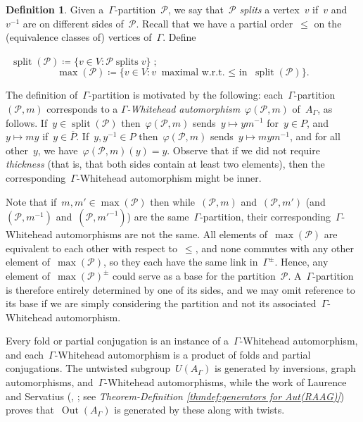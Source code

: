 \documentclass[11pt]{amsart}
\theoremstyle{definition}
\theoremstyle{definition}
\theoremstyle{definition}
\theoremstyle{definition}
\newtheorem{definition}[theorem]{Definition}
\newcommand{\calP}{\mathcal{P}} %
\newcommand{\raag}{A_\Gamma} %
\newcommand{\uag}{U(A_{\Gamma})} %
\newcommand{\oag}{\operatorname{Out}(A_{\Gamma})} %
\newcommand{\splt}[1]{\operatorname{split}({#1})}
\newcommand{\mx}[1]{\operatorname{max}({#1})}
\begin{document}
\begin{definition}\label{def:split and max of a partition}
    Given a~$\Gamma$-partition~$\calP$, we say that~$\calP$ \emph{splits} a vertex~$v$ if~$v$ and~$v^{-1}$ are on different sides of~$\calP$. Recall that we have a partial order~$\leq$ on the (equivalence classes of) vertices of~$\Gamma$. Define
    \begin{center}
       ~$\splt{\calP} \coloneqq \{v \in V \colon \calP \; \text{splits} \; v\} \; ;$
        \[\mx{\calP} \coloneqq \{v \in V \colon v \; \text{maximal w.r.t.~$\leq$ in} \; \splt{\calP}\}.\]
    \end{center}

\end{definition}

The definition of~$\Gamma$-partition is motivated by the following: each~$\Gamma$-partition~$(\calP, m)$ corresponds to a \emph{$\Gamma$-Whitehead automorphism}~$\varphi(\calP, m)$ of~$\raag$, as follows. If~$y \in \splt{\calP}$ then~$\varphi(\calP, m)$ sends~$y \mapsto ym^{-1}$ for~$y \in P$, and~$y \mapsto my$ if~$y \in \overline{P}$. If~$y, y^{-1} \in P$ then~$\varphi(\calP, m)$ sends~$y \mapsto mym^{-1}$, and for all other~$y$, we have~$\varphi(\calP, m)(y) = y$. Observe that if we did not require \emph{thickness} (that is, that both sides contain at least two elements), then the corresponding~$\Gamma$-Whitehead automorphism might be inner. 

Note that if~$m, m' \in \mx{\calP}$ then while~$(\calP, m)$ and~$(\calP, m')$ (and~$(\calP, m^{-1})$ and~$(\calP, m'^{-1})$) are the same~$\Gamma$-partition, their corresponding~$\Gamma$-Whitehead automorphisms are not the same. All elements of~$\mx{\calP}$ are equivalent to each other with respect to~$\leq$, and none commutes with any other element of~$\mx{\calP}$, so they each have the same link in~$\Gamma^\pm$. Hence, any element of~$\mx{\calP}^\pm$ could serve as a base for the partition~$\calP$. A~$\Gamma$-partition is therefore entirely determined by one of its sides, and we may omit reference to its base if we are simply considering the partition and not its associated~$\Gamma$-Whitehead automorphism. 

Every fold or partial conjugation is an instance of a~$\Gamma$-Whitehead automorphism, and each~$\Gamma$-Whitehead automorphism is a product of folds and partial conjugations. The untwisted subgroup~$\uag$ is generated by inversions, graph automorphisms, and~$\Gamma$-Whitehead automorphisms, while the work of Laurence and Servatius (\cite{ServatiusAutRAAGs89}, \cite{LaurenceAutRAAGs95}; see \textit{Theorem-Definition \ref{thmdef:generators for Aut(RAAG)}}) proves that~$\oag$ is generated by these along with twists.
\end{document}
